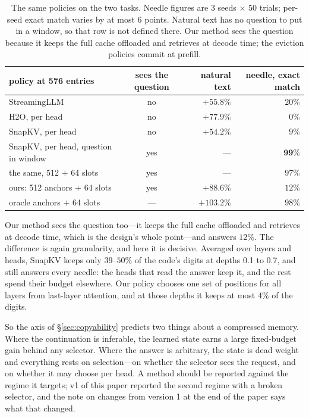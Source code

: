 \documentclass[11pt]{article}
\begin{document}
\begin{table}[ht]
\centering
\small
\begin{tabular}{lcrr}
\toprule
policy at 576 entries & sees the question & natural text & needle, exact match \\
\midrule
StreamingLLM                          & no  & $+55.8\%$ & $20\%$ \\
H2O, per head                         & no  & $+77.9\%$ & $0\%$ \\
SnapKV, per head                      & no  & $+54.2\%$ & $9\%$ \\
SnapKV, per head, question in window  & yes & ---       & $\mathbf{99\%}$ \\
\quad the same, 512 $+$ 64 slots      & yes & ---       & $97\%$ \\
ours: 512 anchors $+$ 64 slots        & yes & $\mathbf{+88.6\%}$ & $12\%$ \\
\midrule
oracle anchors $+$ 64 slots           & --- & $+103.2\%$ & $98\%$ \\
\bottomrule
\end{tabular}
\caption{The same policies on the two tasks. Needle figures are 3 seeds
$\times$ 50 trials; per-seed exact match varies by at most 6 points. Natural
text has no question to put in a window, so that row is not defined there.
Our method sees the question because it keeps the full cache offloaded and
retrieves at decode time; the eviction policies commit at prefill.}
\label{tab:inversion}
\end{table}

Our method sees the question too---it keeps the full cache offloaded and
retrieves at decode time, which is the design's whole point---and answers
$12\%$. The difference is again granularity, and here it is decisive. Averaged
over layers and heads, SnapKV keeps only $39$--$50\%$ of the code's digits at
depths 0.1 to 0.7, and still answers every needle: the heads that read the
answer keep it, and the rest spend their budget elsewhere. Our policy chooses one
set of positions for all layers from last-layer attention, and at those depths
it keeps at most $4\%$ of the digits.

So the axis of \S\ref{sec:copyability} predicts two things about a compressed
memory. Where the continuation is inferable, the learned state earns a large
fixed-budget gain behind any selector. Where the answer is arbitrary, the state
is dead weight and everything rests on selection---on whether the selector sees
the request, and on whether it may choose per head. A method should be reported
against the regime it targets; v1 of this paper reported the second regime with
a broken selector, and the note on changes from version 1 at the end of the
paper says what that changed.
\end{document}
